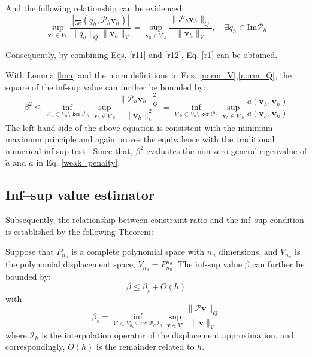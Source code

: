 \begin{pf}
And the following relationship can be evidenced:
\begin{equation}\label{r12}
\sup_{\boldsymbol{v}_h \in V_h} \frac{\left| \frac{1}{3\kappa} (q_h, \mathcal{P}_h \boldsymbol{v}_h) \right|}{\|q_h\|_Q \|\boldsymbol{v}_h\|_V} = \sup_{\boldsymbol{v}_h \in V'_h} \frac{\|\mathcal{P}_h \boldsymbol{v}_h\|_Q}{\|\boldsymbol{v}_h\|_V}, \quad \exists q_h \in \mathrm{Im} \mathcal{P}_h
\end{equation}

Consequently, by combining Eqs. \eqref{r11} and \eqref{r12}, Eq. \eqref{r1} can be obtained.
\end{pf}

\begin{rmk}
With Lemma \ref{lma} and the norm definitions in Eqs. \eqref{norm_V},\eqref{norm_Q}, the square of the inf-sup value can further be bounded by:
\begin{equation}
\label{infsup_test}
\beta^2 \le \inf_{V'_h \subset V_h \setminus \ker \mathcal{P}_h} \sup_{\boldsymbol{v}_h \in V'_h} \frac{\|\mathcal{P}_h \boldsymbol{v}_h\|_Q^2}{\|\boldsymbol{v}_h\|_V^2} = \inf_{V'_h \subset V_h \setminus \ker \mathcal{P}_h} \sup_{\boldsymbol{v}_h \in V'_h} \frac{\tilde{a}(\boldsymbol{v}_h, \boldsymbol{v}_h)}{a(\boldsymbol{v}_h, \boldsymbol{v}_h)}
\end{equation}
The left-hand side of the above equation is consistent with the minimum-maximum principle \cite{babuska1991} and again proves the equivalence with the traditional numerical inf-sup test \cite{malkus1981}. Since that, $\beta^2$ evaluates the non-zero general eigenvalue of $\tilde{a}$ and $a$ in Eq. \eqref{weak_penalty}.
\end{rmk}

\subsection{Inf--sup value estimator}
Subsequently, the relationship between constraint ratio and the inf--sup condition is established by the following Theorem:
\begin{thm}
Suppose that $P_{n_u}$ is a complete polynomial space with $n_u$ dimensions, and $V_{n_u}$ is the polynomial displacement space, $V_{n_u} = P_{n_u}^{n_d}$. The inf-sup value $\beta$ can further be bounded by:
\begin{equation}\label{estimator}
\beta \le \beta_s + O(h)
\end{equation}
with
\begin{equation}\label{beta_s}
\beta_s = \inf_{V' \subset V_{n_u} \setminus \ker \mathcal{P}_h \mathcal{I}_h} \sup_{\boldsymbol{v} \in V'} \frac{\|\mathcal{P} \boldsymbol{v}\|_Q}{\|\boldsymbol{v}\|_V}
\end{equation}
where $\mathcal{I}_h$ is the interpolation operator of the displacement approximation, and correspondingly, $O(h)$ is the remainder related to $h$.
\end{thm}

